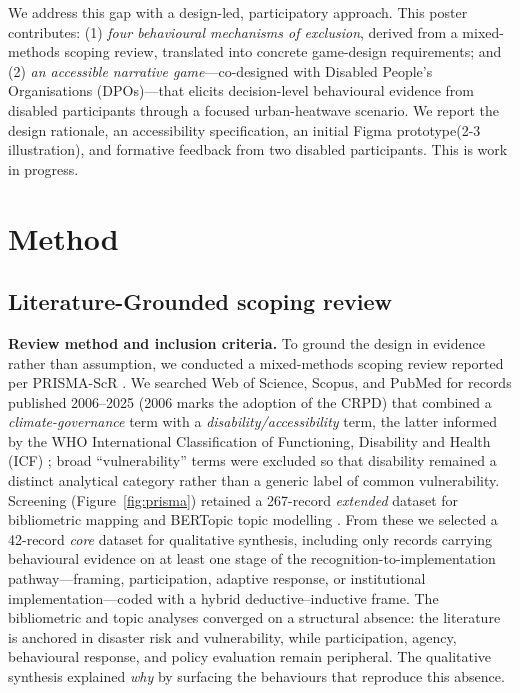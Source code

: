 \documentclass[sigconf]{acmart}
\begin{document}
We address this gap with a design-led, participatory approach. This
poster contributes: (1) \emph{four behavioural mechanisms of exclusion},
derived from a mixed-methods scoping review, translated into concrete
game-design requirements; and (2) \emph{an accessible narrative
game}---co-designed with Disabled People's Organisations (DPOs)---that
elicits decision-level behavioural evidence from disabled participants
through a focused urban-heatwave scenario. We report the design rationale, an accessibility specification, an initial Figma prototype(2-3 illustration), and formative feedback from two disabled participants. This is work in
progress.

\section{Method}
\subsection{Literature-Grounded scoping review}
\textbf{Review method and inclusion criteria.} To ground the design in
evidence rather than assumption, we conducted a mixed-methods scoping
review reported per PRISMA-ScR
\cite{arksey2005scoping,levac2010scoping,tricco2018prisma}. We searched
Web of Science, Scopus, and PubMed for records published 2006--2025
(2006 marks the adoption of the CRPD) that combined a
\emph{climate-governance} term with a \emph{disability/accessibility}
term, the latter informed by the WHO International Classification of
Functioning, Disability and Health (ICF) \cite{who_2001_icf}; broad
``vulnerability'' terms were excluded so that disability remained a
distinct analytical category rather than a generic label of common
vulnerability. Screening (Figure~\ref{fig:prisma}) retained a
267-record \emph{extended} dataset for bibliometric mapping and BERTopic
topic modelling \cite{grootendorst_2022_bertopic}. From these we selected
a 42-record \emph{core} dataset for qualitative synthesis, including only
records carrying behavioural evidence on at least one stage of the
recognition-to-implementation pathway---framing, participation, adaptive
response, or institutional implementation---coded with a hybrid
deductive--inductive frame. The bibliometric and topic analyses converged
on a structural absence: the literature is anchored in disaster risk and
vulnerability, while participation, agency, behavioural response, and
policy evaluation remain peripheral. The qualitative synthesis explained
\emph{why} by surfacing the behaviours that reproduce this absence.
\end{document}
